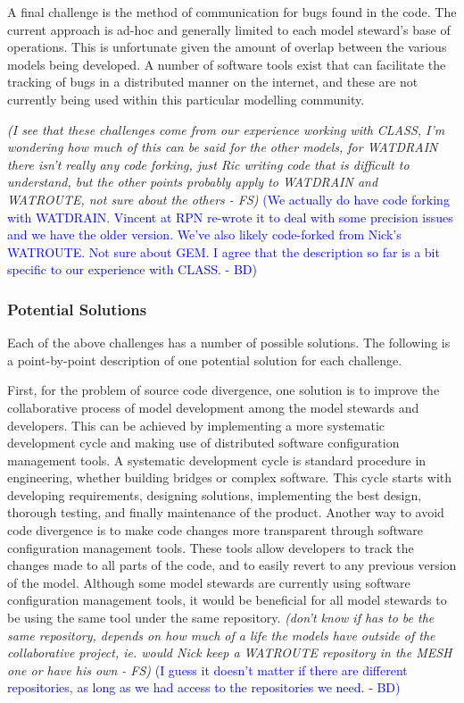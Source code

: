 \documentclass[hess]{copernicus}
\begin{document}
A final challenge is the method of communication for bugs found in the code. The current approach is ad-hoc and generally limited to each model steward's base of operations. This is unfortunate given the amount of overlap between the various models being developed. A number of software tools exist that can facilitate the tracking of bugs in a distributed manner on the internet, and these are not currently being used within this particular modelling community.

{\em (I see that these challenges come from our experience working with CLASS, I'm wondering how much of this can be said for the other models, for WATDRAIN there isn't really any code forking, just Ric writing code that is difficult to understand, but the other points probably apply to WATDRAIN and WATROUTE, not sure about the others - FS)}\textcolor{blue}{ (We actually do have code forking with WATDRAIN. Vincent at RPN re-wrote it to deal with some precision issues and we have the older version. We've also likely code-forked from Nick's WATROUTE. Not sure about GEM. I agree that the description so far is a bit specific to our experience with CLASS. - BD)}

\subsubsection{Potential Solutions}
Each of the above challenges has a number of possible solutions. The following is a point-by-point description of one potential solution for each challenge.

First, for the problem of source code divergence, one solution is to improve the collaborative process of model development among the model stewards and developers. This can be achieved by implementing a more systematic development cycle and making use of distributed software configuration management tools. A systematic development cycle is standard procedure in engineering, whether building bridges or complex software. This cycle starts with developing requirements, designing solutions, implementing the best design, thorough testing, and finally maintenance of the product. Another way to avoid code divergence is to make code changes more transparent through software configuration management tools. These tools allow developers to track the changes made to all parts of the code, and to easily revert to any previous version of the model. Although some model stewards are currently using software configuration management tools, it would be beneficial for all model stewards to be using the same tool under the same repository. {\em (don't know if has to be the same repository, depends on how much of a life the models have outside of the collaborative project, ie. would Nick keep a WATROUTE repository in the MESH one or have his own - FS)}\textcolor{blue}{ (I guess it doesn't matter if there are different repositories, as long as we had access to the repositories we need. - BD)}
\end{document}
